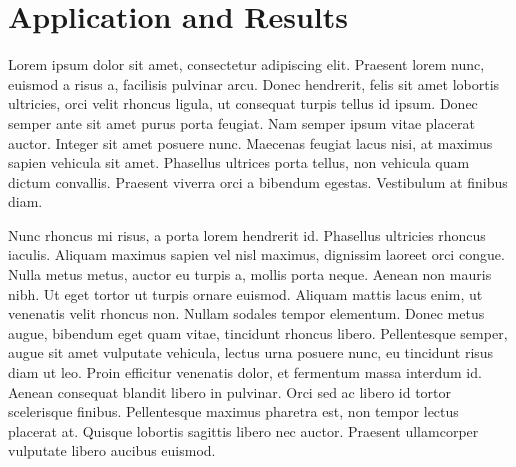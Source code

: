 \documentclass[../main.tex]{subfiles}
\begin{document}
\section{Application and Results}

    Lorem ipsum dolor sit amet, consectetur adipiscing elit. Praesent lorem nunc, euismod a risus a,
    facilisis pulvinar arcu. Donec hendrerit, felis sit amet lobortis ultricies, orci velit rhoncus 
    ligula, ut consequat turpis tellus id ipsum. Donec semper ante sit amet purus porta feugiat. 
    Nam semper ipsum vitae placerat auctor. Integer sit amet posuere nunc. Maecenas feugiat lacus 
    nisi, at maximus sapien vehicula sit amet. Phasellus ultrices porta tellus, non vehicula quam 
    dictum convallis. Praesent viverra orci a bibendum egestas. Vestibulum at finibus diam.

    Nunc rhoncus mi risus, a porta lorem hendrerit id. Phasellus ultricies rhoncus iaculis. Aliquam 
    maximus sapien vel nisl maximus, dignissim laoreet orci congue. Nulla metus metus, auctor eu turpis 
    a, mollis porta neque. Aenean non mauris nibh. Ut eget tortor ut turpis ornare euismod. Aliquam 
    mattis lacus enim, ut venenatis velit rhoncus non. Nullam sodales tempor elementum. Donec metus 
    augue, bibendum eget quam vitae, tincidunt rhoncus libero. Pellentesque semper, augue sit amet 
    vulputate vehicula, lectus urna posuere nunc, eu tincidunt risus diam ut leo. Proin efficitur 
    venenatis dolor, et fermentum massa interdum id. Aenean consequat blandit libero in pulvinar. Orci 
    sed ac libero id tortor scelerisque finibus. Pellentesque maximus pharetra est, non tempor lectus 
    placerat at. Quisque lobortis sagittis libero nec auctor. Praesent ullamcorper vulputate libero
    aucibus euismod. 
    
\end{document}
